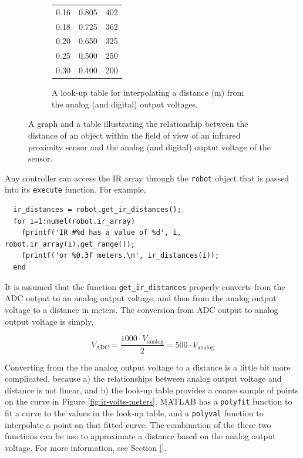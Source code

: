 \documentclass[10pt]{article}
\begin{document}
\begin{figure}[t]
\begin{subfigure}{0.45\textwidth}
\begin{center}
\begin{tabular}{|p{}|p{}|p{}|}
       0.16 & 0.805 & 402 \\
       0.18 & 0.725 & 362 \\
       0.20 & 0.650 & 325 \\
       0.25 & 0.500 & 250 \\
       0.30 & 0.400 & 200 \\
       \hline
    \end{tabular}
  \end{center}
    \caption{A look-up table for interpolating a distance (m) from the analog (and digital) output voltages.}
    \label{fig:ir-adc}
  \end{subfigure}
  \caption{A graph and a table illustrating the relationship between the distance of an object within the field of view of an infrared proximity sensor and the analog (and digital) ouptut voltage of the sensor.}\label{fig:animals}
  \label{fig:quickbot}
\end{figure}

Any controller can access the IR array through the \texttt{robot} object that is passed into its \texttt{execute} function. For example,
\begin{verbatim}
  ir_distances = robot.get_ir_distances();
  for i=1:numel(robot.ir_array)
    fprintf('IR #%d has a value of %d', i, robot.ir_array(i).get_range());
    fprintf('or %0.3f meters.\n', ir_distances(i));
  end
\end{verbatim}

It is assumed that the function \texttt{get\_ir\_distances} properly converts from the ADC output to an analog output voltage, and then from the analog output voltage to a distance in meters. The conversion from ADC output to analog output voltage is simply,

\begin{equation*}
  V_{\text{ADC}} = \frac{1000\cdot V_{\text{analog}}}{2} = 500\cdot V_{\text{analog}}
\end{equation*}

Converting from the the analog output voltage to a distance is a little bit more complicated, because a) the relationships between analog output voltage and distance is not linear, and b) the look-up table provides a coarse sample of points on the curve in Figure \ref{fig:ir-volts-meters}. MATLAB has a \texttt{polyfit} function to fit a curve to the values in the look-up table, and a \texttt{polyval} function to interpolate a point on that fitted curve. The combination of the these two functions can be use to approximate a distance based on the analog output voltage. For more information, see Section \ref{}.
\end{document}
